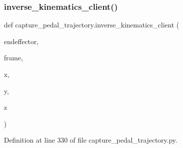 \mbox{\label{namespacecapture__pedal__trajectory_affbe4020d535c4967511b40d3aef141d}} 
\subsubsection{\texorpdfstring{inverse\_kinematics\_client()}{inverse\_kinematics\_client()}}
{\footnotesize\ttfamily def capture\+\_\+pedal\+\_\+trajectory.\+inverse\+\_\+kinematics\+\_\+client (\begin{DoxyParamCaption}\item[{}]{endeffector,  }\item[{}]{frame,  }\item[{}]{x,  }\item[{}]{y,  }\item[{}]{z }\end{DoxyParamCaption})}



Definition at line 330 of file capture\+\_\+pedal\+\_\+trajectory.\+py.



